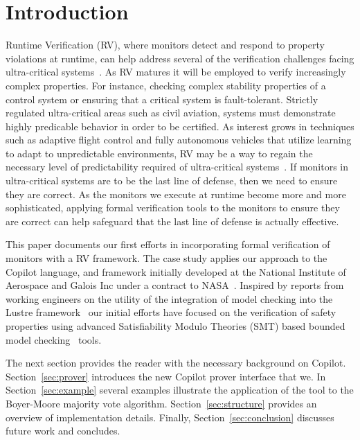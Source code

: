 \section{Introduction}\label{sec:intro}
Runtime Verification (RV), where monitors detect and respond to
property violations at runtime, can help address several of the
verification challenges facing ultra-critical
systems~\cite{pike-rv-11}.  As RV matures
it will be employed to verify increasingly complex 
properties. For instance, checking complex stability properties of a
control system or ensuring that a critical system is fault-tolerant.
Strictly regulated ultra-critical areas such as civil aviation,
systems must demonstrate highly predicable behavior in order to be
certified. As interest grows in techniques such as adaptive flight
control and fully autonomous vehicles that utilize learning to adapt
to unpredictable environments, RV may be a way to regain the necessary
level of predictability required of ultra-critical
systems~\cite{simplex}.  If
monitors in ultra-critical systems are to be the last line of defense,
then we need to ensure they are correct.  As the monitors we execute
at runtime become more and more sophisticated, applying formal
verification tools to the monitors to ensure they are correct can help
safeguard that the last line of defense is actually effective. 


This paper documents our first efforts in incorporating formal
verification of monitors with a RV framework.  The case study applies
our approach to the Copilot language, and framework initially
developed at the National Institute of Aerospace and Galois Inc under
a contract to NASA~\cite{copilot,pike-isse-13}.  Inspired by reports
from working engineers on the utility of the integration of model
checking into the Lustre framework~\cite{Hagen08} our initial efforts
have focused on the verification of safety properties using advanced
Satisfiability Modulo Theories (SMT) based bounded model
checking~\cite{ClarkeBounded01} tools.

 
The next section provides the reader with the necessary background on
Copilot. Section~\ref{sec:prover} introduces the new Copilot prover interface
that we. In Section~\ref{sec:example}  several examples illustrate the
application of the tool to the Boyer-Moore majority vote
algorithm. Section~\ref{sec:structure} provides an overview of
implementation details. Finally, Section~\ref{sec:conclusion}
discusses future work and concludes. 

  


